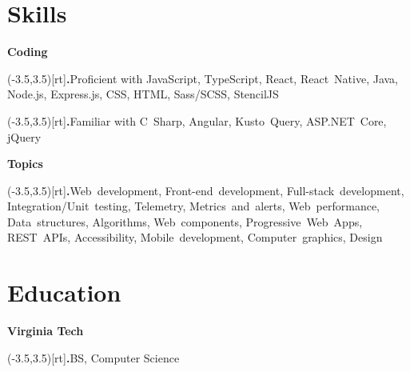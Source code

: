 \documentclass[10pt]{extarticle}
\newcommand{\BulletMark}{{\color{bulletMark}\large\bfseries.}}
\newcommand{\SideBox}[1]{\makebox(-3.5,3.5)[rt]{#1}}
\newcommand{\Bullet}[1]{\item\SideBox{\BulletMark}{\color{bullet}#1}}
\newcommand{\Bullets}[1]{\begin{trivlist}#1\end{trivlist}}
\newcommand{\Subtitle}[1]{{\color{subtitle}\bfseries#1}}
\newcommand{\Subsection}[2]{\Subtitle{#1}\Bullets{#2}}
\begin{document}
\begin{paracol}{2}
\begin{rightcolumn}
    \section{Skills}
      \Subsection{Coding}{
        \Bullet{Proficient with JavaScript, TypeScript, React, React~Native, Java, Node.js, Express.js, CSS, HTML, Sass/SCSS, StencilJS}
        \Bullet{Familiar with C~Sharp, Angular, Kusto~Query, ASP.NET~Core, jQuery}
      }
      \vfill
      \Subsection{Topics}{
        \Bullet{Web~development, Front-end~development, Full-stack~development, Integration/Unit~testing, Telemetry, Metrics~and~alerts, Web~performance, Data~structures, Algorithms, Web~components, Progressive~Web~Apps, REST~APIs, Accessibility, Mobile~development, Computer~graphics, Design}
      }
    \vfill
    \section{Education}
      \Subsection{Virginia Tech}{
        \Bullet{BS, Computer Science}
      }
    \pagebreak
  \end{rightcolumn}
\end{paracol}
\end{document}
